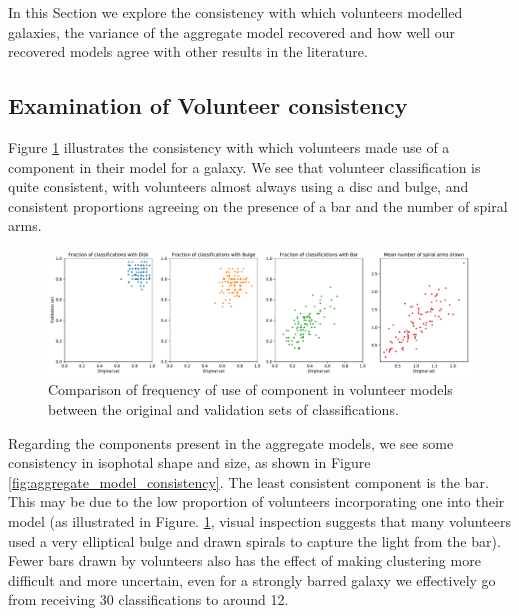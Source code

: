 \documentclass[../main.tex]{subfiles}
\begin{document}
\label{sec:results}

In this Section we explore the consistency with which volunteers modelled galaxies, the variance of the aggregate model recovered and how well our recovered models agree with other results in the literature.


\subsection{Examination of Volunteer consistency}
Figure \ref{fig:volunteer_component_consistency} illustrates the consistency with which volunteers made use of a component in their model for a galaxy. We see that volunteer classification is quite consistent, with volunteers almost always using a disc and bulge, and consistent proportions agreeing on the presence of a bar and the number of spiral arms.

\begin{figure}
  \includegraphics[width=17.3cm]{images__results/component_frequency.pdf}
  \caption{Comparison of frequency of use of component in volunteer models between the original and validation sets of classifications.}
  \label{fig:volunteer_component_consistency}
\end{figure}

Regarding the components present in the aggregate models, we see some consistency in isophotal shape and size, as shown in Figure \ref{fig:aggregate_model_consistency}. The least consistent component is the bar. This may be due to the low proportion of volunteers incorporating one into their model (as illustrated in Figure. \ref{fig:volunteer_component_consistency}, visual inspection suggests that many volunteers used a very elliptical bulge and drawn spirals to capture the light from the bar). Fewer bars drawn by volunteers also has the effect of making clustering more difficult and more uncertain, even for a strongly barred galaxy we effectively go from receiving 30 classifications to around 12.
\end{document}
